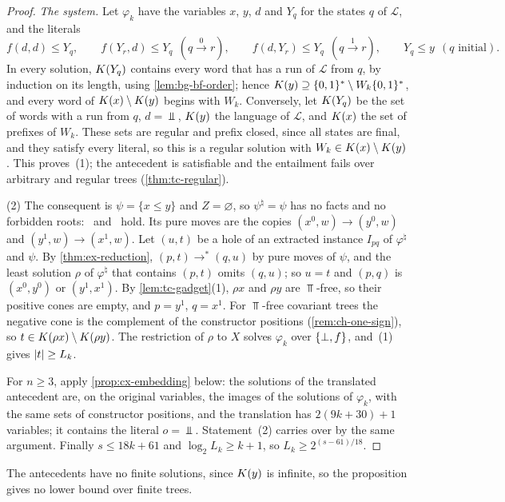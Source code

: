\begin{proof}
\emph{The system.} Let $\varphi_k$ have the variables $x$, $y$, $d$ and $Y_q$
for the states $q$ of $\mathcal L$, and the literals
\[
 f(d,d)\le Y_q,\qquad f(Y_r,d)\le Y_q\ \ (q\xrightarrow0r),\qquad
 f(d,Y_r)\le Y_q\ \ (q\xrightarrow1r),\qquad Y_q\le y\ \ (q\text{ initial}).
\]
In every solution, $K(Y_q)$ contains every word that has a run of
$\mathcal L$ from $q$, by induction on its length, using
\cref{lem:bg-bf-order}; hence $K(y)\supseteq\{0,1\}^*\setminus W_k\{0,1\}^*$,
and every word of $K(x)\setminus K(y)$ begins with $W_k$. Conversely, let
$K(Y_q)$ be the set of words with a run from $q$, $d=\Bot$, $K(y)$ the
language of $\mathcal L$, and $K(x)$ the set of prefixes of $W_k$. These
sets are regular and prefix closed, since all states are final, and they
satisfy every literal, so this is a regular solution with
$W_k\in K(x)\setminus K(y)$. This proves~(1); the antecedent is
satisfiable and the entailment fails over arbitrary and regular trees
(\cref{thm:tc-regular}).

(2) The consequent is $\psi=\{x\le y\}$ and $Z=\varnothing$, so $\psi^\natural=
\psi$ has no facts and no forbidden roots: \CondI\ and \CondU\ hold.
Its pure moves are the copies $(x^0,w)\to(y^0,w)$ and $(y^1,w)\to(x^1,w)$. Let
$(u,t)$ be a hole of an extracted instance $I_{pq}$ of $\varphi^\natural$ and
$\psi$. By \cref{thm:ex-reduction}, $(p,t)\to^*(q,u)$ by pure moves of $\psi$,
and the least solution $\rho$ of $\varphi^\natural$ that contains $(p,t)$ omits
$(q,u)$; so $u=t$ and $(p,q)$ is $(x^0,y^0)$ or $(y^1,x^1)$. By
\cref{lem:tc-gadget}(1), $\rho x$ and $\rho y$ are $\Top$-free, so their
positive cones are empty, and $p=y^1$, $q=x^1$. For $\Top$-free covariant trees
the negative cone is the complement of the constructor positions
(\cref{rem:ch-one-sign}), so $t\in K(\rho x)\setminus K(\rho y)$. The
restriction of $\rho$ to $X$ solves $\varphi_k$ over $\{\bot,f\}$, and~(1) gives
$\lvert t\rvert\ge L_k$.

For $n\ge3$, apply \cref{prop:cx-embedding} below: the solutions of the
translated antecedent are, on the original variables, the images of the
solutions of $\varphi_k$, with the same sets of constructor positions, and the
translation has $2(9k+30)+1$ variables; it contains the literal $o=\Bot$. Statement~(2) carries over by the same
argument. Finally $s\le18k+61$ and $\log_2L_k\ge k+1$, so
$L_k\ge2^{(s-61)/18}$.
\end{proof}

The antecedents have no finite solutions, since $K(y)$ is infinite, so the
proposition gives no lower bound over finite trees.

